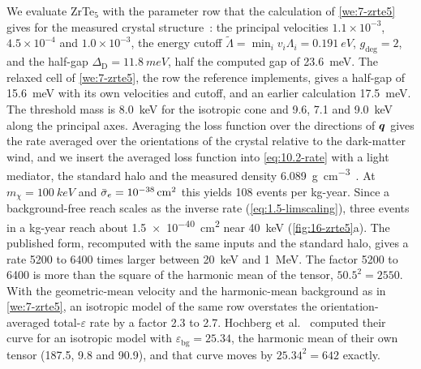 We evaluate ZrTe$_5$ with the parameter row that the calculation of \cref{we:7-zrte5} gives for the measured crystal structure~\cite[Table~1 and text below it]{geilhufe2020dirac}: the principal velocities $1.1\times10^{-3}$, $4.5\times10^{-4}$ and $1.0\times10^{-3}$, the energy cutoff $\tilde\Lambda = \min_iv_i\Lambda_i = \SI{0.191}{eV}$, $g_{\mathrm{deg}} = 2$, and the half-gap $\Delta_{\mathrm{D}} = \SI{11.8}{meV}$, half the computed gap of \SI{23.6}{meV}. The relaxed cell of \cref{we:7-zrte5}, the row the reference implements, gives a half-gap of \SI{15.6}{meV} with its own velocities and cutoff, and an earlier calculation \SI{17.5}{meV}. The threshold mass is \SI{8.0}{keV} for the isotropic cone and 9.6, 7.1 and \SI{9.0}{keV} along the principal axes. Averaging the loss function over the directions of $\bm{q}$ gives the rate averaged over the orientations of the crystal relative to the dark-matter wind, and we insert the averaged loss function into \cref{eq:10.2-rate} with a light mediator, the standard halo and the measured density \SI{6.089}{g.cm^{-3}}~\cite[Fig.~3]{geilhufe2020dirac}. At $m_\chi = \SI{100}{keV}$ and $\bar{\sigma}_{e} = \SI{e-38}{cm^2}$ this yields 108 events per kg-year. Since a background-free reach scales as the inverse rate (\cref{eq:1.5-limscaling}), three events in a kg-year reach about \SI{1.5e-40}{cm^2} near \SI{40}{keV} (\cref{fig:16-zrte5}a). The published form, recomputed with the same inputs and the standard halo, gives a rate 5200 to 6400 times larger between \SI{20}{keV} and \SI{1}{MeV}. The factor 5200 to 6400 is more than the square of the harmonic mean of the tensor, $50.5^2 = 2550$. With the geometric-mean velocity and the harmonic-mean background as in \cref{we:7-zrte5}, an isotropic model of the same row overstates the orientation-averaged total-$\varepsilon$ rate by a factor 2.3 to 2.7. Hochberg et al.~\cite{hochberg2018detection} computed their curve for an isotropic model with $\varepsilon_{\mathrm{bg}} = 25.34$, the harmonic mean of their own tensor (187.5, 9.8 and 90.9), and that curve moves by $25.34^2 = 642$ exactly.

